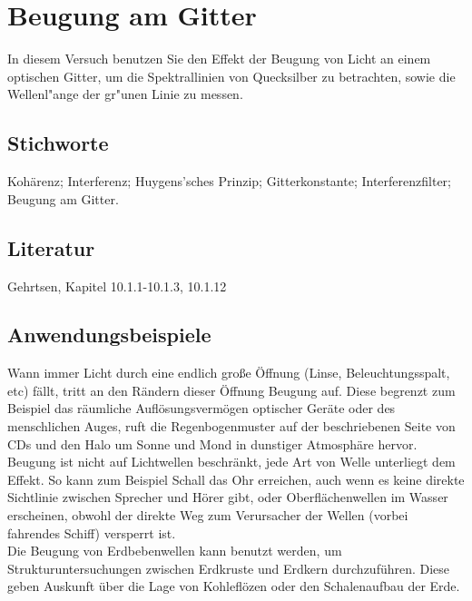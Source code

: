 \chapter{Beugung am Gitter}
\label{v:10}

In diesem Versuch benutzen Sie den Effekt der Beugung von Licht an einem optischen Gitter, um die Spektrallinien von Quecksilber zu betrachten, sowie die Wellenl"ange der gr"unen Linie zu messen.\\

\section{Stichworte}

Kohärenz; Interferenz; Huygens'sches Prinzip; Gitterkonstante; Interferenzfilter; Beugung am Gitter.
%
\section{Literatur}

Gehrtsen, Kapitel 10.1.1-10.1.3, 10.1.12
%

\section{Anwendungsbeispiele}

Wann immer Licht durch eine endlich große Öffnung (Linse, Beleuchtungsspalt, etc) fällt, tritt an den Rändern dieser Öffnung Beugung auf. Diese begrenzt zum Beispiel das räumliche Auflösungsvermögen optischer Geräte oder des menschlichen Auges, ruft die Regenbogenmuster auf der beschriebenen Seite von CDs und den Halo um Sonne und Mond in dunstiger Atmosphäre hervor.\\
Beugung ist nicht auf Lichtwellen beschränkt, jede Art von Welle unterliegt dem Effekt. So kann zum Beispiel Schall das Ohr erreichen, auch wenn es keine direkte Sichtlinie zwischen Sprecher und Hörer gibt, oder Oberflächenwellen im Wasser erscheinen, obwohl der direkte Weg zum Verursacher der Wellen (vorbei fahrendes Schiff) versperrt ist.\\
Die Beugung von Erdbebenwellen kann benutzt werden, um Strukturuntersuchungen zwischen Erdkruste und Erdkern durchzuführen. Diese geben Auskunft über die Lage von Kohleflözen oder den Schalenaufbau der Erde.

